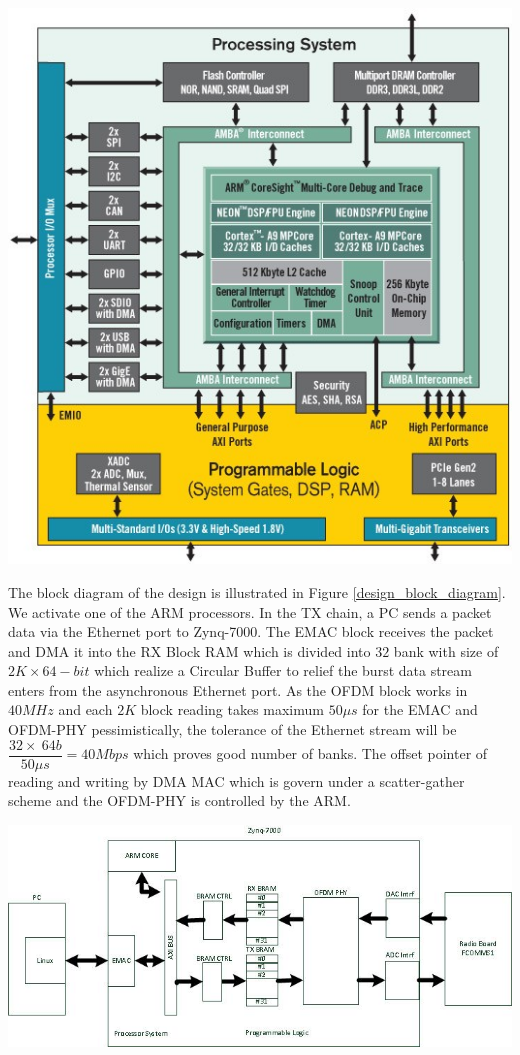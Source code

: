 \begin{center}
\includegraphics[width=\textwidth]{content/fig/zynq_inside.JPG}
\label{zynq_inside}
\end{center}

The block diagram of the design is illustrated in Figure \ref{design_block_diagram}. We activate one of the ARM processors. In the TX chain, a PC sends a packet data via the Ethernet port to Zynq-7000. The EMAC block receives the packet and DMA it into the RX Block RAM which is divided into $32$ bank with size of $2K \times 64-bit$ which realize a Circular Buffer to relief the burst data stream enters from the asynchronous Ethernet port. As the OFDM block works in $40 MHz$ and each $2K$ block reading takes maximum $50\mu s$ for the EMAC and OFDM-PHY pessimistically, the tolerance of the Ethernet stream will be $\dfrac{32 \times \ 64b}{50\mu s} = 40Mbps$ which proves good number of banks. The offset pointer of reading and writing by DMA MAC which is govern under a scatter-gather scheme and the OFDM-PHY is controlled by the ARM.\\

\begin{center}
\includegraphics[width=\textwidth]{content/fig/fpga_internal.JPG}
\label{design_block_diagram}
\end{center}

